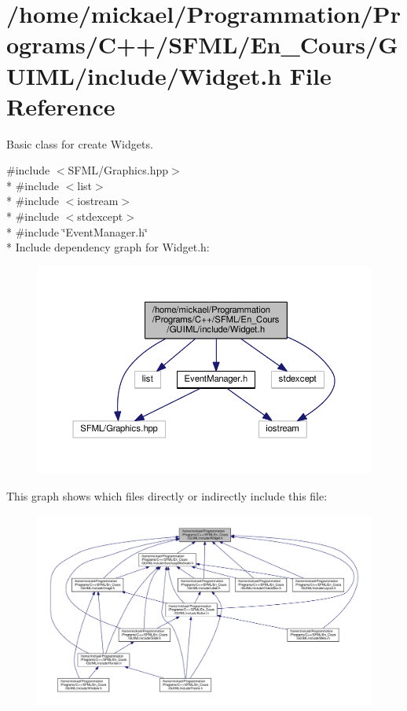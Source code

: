 \section{/home/mickael/\-Programmation/\-Programs/\-C++/\-S\-F\-M\-L/\-En\-\_\-\-Cours/\-G\-U\-I\-M\-L/include/\-Widget.h File Reference}
\label{_widget_8h}


Basic class for create Widgets.  


{\ttfamily \#include $<$S\-F\-M\-L/\-Graphics.\-hpp$>$}\\*
{\ttfamily \#include $<$list$>$}\\*
{\ttfamily \#include $<$iostream$>$}\\*
{\ttfamily \#include $<$stdexcept$>$}\\*
{\ttfamily \#include \char`\"{}Event\-Manager.\-h\char`\"{}}\\*
Include dependency graph for Widget.\-h\-:\nopagebreak
\begin{figure}[H]
\begin{center}
\leavevmode
\includegraphics[width=350pt]{_widget_8h__incl}
\end{center}
\end{figure}
This graph shows which files directly or indirectly include this file\-:\nopagebreak
\begin{figure}[H]
\begin{center}
\leavevmode
\includegraphics[width=350pt]{_widget_8h__dep__incl}
\end{center}
\end{figure}

